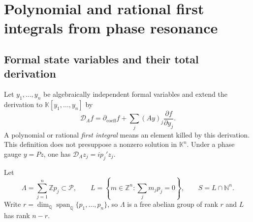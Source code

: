 \documentclass[11pt,a4paper]{article}
\numberwithin{equation}{section}
\theoremstyle{definition}
\theoremstyle{remark}
\newcommand{\K}{\mathbb K}
\newcommand{\Q}{\mathbb Q}
\newcommand{\N}{\mathbb N}
\newcommand{\Z}{\mathbb Z}
\newcommand{\PP}{\mathcal P}
\newcommand{\Span}{\operatorname{span}}
\begin{document}
\section{Polynomial and rational first integrals from phase resonance}\label{sec:invariants}

\subsection{Formal state variables and their total derivation}
Let $y_1,\ldots,y_n$ be algebraically independent formal variables and
extend the derivation to $\K[y_1,\ldots,y_n]$ by
\[
 \mathcal D_A f=\partial_{\mathrm{coeff}}f
   +\sum_j(Ay)_j\frac{\partial f}{\partial y_j}.
\]
A polynomial or rational \emph{first integral} means an element killed by
this derivation. This definition does not presuppose a nonzero solution in
$\K^n$. Under a phase gauge $y=Pz$, one has $\mathcal D_A z_j=ip_j'z_j$.

Let
\[
 \Lambda=\sum_{j=1}^n\Z p_j\subset\PP,\qquad
 L=\left\{m\in\Z^n:\sum_jm_jp_j=0\right\},\qquad
 S=L\cap\N^n.
\]
Write $r=\dim_{\Q}\Span_{\Q}\{p_1,\ldots,p_n\}$, so $\Lambda$ is a free
abelian group of rank $r$ and $L$ has rank $n-r$.
\end{document}
